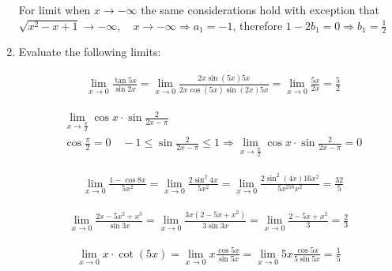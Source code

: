 \documentclass{article}
\begin{document}
\begin{enumerate}
For limit when $x \to -\infty$ the same considerations hold with exception that $\sqrt{x^2-x+1} \to -\infty, \quad x \to -\infty \Rightarrow a_1 = -1$, therefore $1 - 2b_1 = 0 \Rightarrow b_1 = \frac{1}{2}$


\newpage
\item Evaluate the following limits:

\begin{align*}
&\lim_{x \to 0} \frac{\tan{5x}}{\sin{2x}} = \lim_{x \to 0} \frac{2x\sin{(5x)}5x}{2x\cos{(5x)}\sin{(2x)}5x} =
\lim_{x \to 0} \frac{5x}{2x} = \frac{5}{2} 
\end{align*}

\begin{align*}
&\lim_{x \to \frac{\pi}{2}} \cos{x} \cdot \sin{\frac{2}{2x - \pi}}\\
&\cos{\frac{\pi}{2}} = 0 \quad -1 \leq \sin{\frac{2}{2x - \pi}} \leq 1 \Rightarrow \lim_{x \to \frac{\pi}{2}} \cos{x} \cdot \sin{\frac{2}{2x - \pi}} = 0
\end{align*}

\begin{align*}
&\lim_{x \to 0} \frac{1 - \cos{8x}}{5x^2} = \lim_{x \to 0} \frac{2\sin^2{4x}}{5x^2} = \lim_{x \to 0} \frac{2\sin^2{(4x)}16x^2}{5x^216x^2} = \frac{32}{5}
\end{align*}

\begin{align*}
\lim_{x \to 0} \frac{2x-5x^2+x^3}{\sin{3x}} = \lim_{x \to 0} \frac{3x(2-5x+x^2)}{3\sin{3x}} = \lim_{x \to 0} \frac{2-5x+x^2}{3} = \frac{2}{3}
\end{align*}

\begin{align*}
\lim_{x \to 0} x \cdot \cot{(5x)} = \lim_{x \to 0} x \frac{\cos{5x}}{\sin{5x}} = \lim_{x \to 0} 5x \frac{\cos{5x}}{5\sin{5x}} = \frac{1}{5}
\end{align*}

\end{enumerate}
\end{document}
